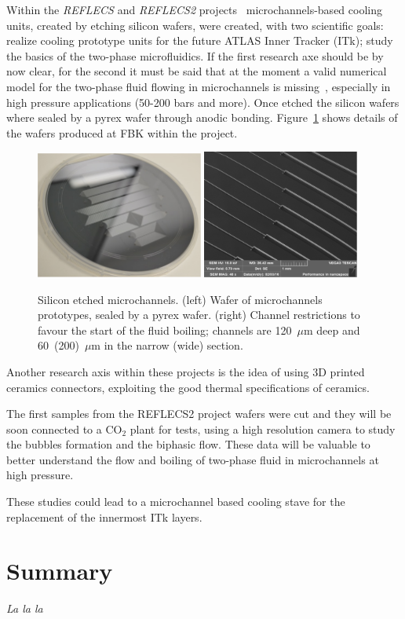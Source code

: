 Within the {\it REFLECS} and {\it REFLECS2} projects~\cite{REFLECS} microchannels-based cooling units, 
created by etching silicon wafers, were created, with two scientific goals: realize cooling prototype units 
for the future ATLAS Inner Tracker (ITk); study the basics of the two-phase microfluidics. If the first research 
axe should be by now clear, for the second it must be said that at the moment a valid numerical model for 
the two-phase fluid flowing in microchannels is missing~\cite{KIM201474}, especially in high pressure applications (50-200 
bars and more).
Once etched the silicon wafers where sealed by a pyrex wafer through anodic bonding. 
Figure~\ref{fig:reflecs} shows details of the wafers produced at FBK within the project. 
\begin{figure}[!htpb]
\centering
\includegraphics[width=0.49\textwidth]{Wafer.pdf}
\includegraphics[width=0.46\textwidth]{restrictions.pdf}
\caption{\label{fig:reflecs}Silicon etched microchannels. (left) Wafer of microchannels prototypes, 
sealed by a pyrex wafer. (right) Channel restrictions to favour the start of the fluid boiling; channels are 
120~$\mu$m deep and 60~(200)~$\mu$m in the narrow (wide) section.}
\end{figure}
Another research axis within these projects is the idea of using 3D printed ceramics connectors, 
exploiting the good thermal specifications of ceramics. 

The first samples from the REFLECS2 project wafers were cut and they will be soon connected 
to a CO$_2$ plant for tests, using a high resolution camera to study the bubbles formation and the 
biphasic flow. These data will be valuable to better understand the flow and boiling of two-phase fluid 
in microchannels at high pressure. 

These studies could lead to a microchannel based cooling stave for the replacement of the innermost 
ITk layers.

\chapter*{Summary}
{\it La la la}

